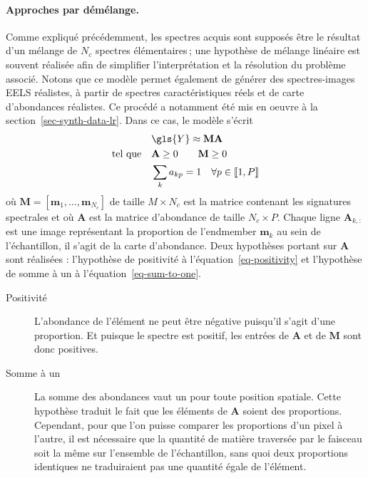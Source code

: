    \paragraph{Approches par démélange.} Comme expliqué précédemment, les spectres acquis sont supposés être le résultat d'un mélange de $N_c$ spectres élémentaires\,; une hypothèse de mélange linéaire est souvent réalisée afin de simplifier l'interprétation et la résolution du problème associé. %
    Notons que ce modèle permet également de générer des spectres-images EELS réalistes, à partir de spectres caractéristiques réels et de carte d'abondances réalistes. Ce procédé a notamment été mis en oeuvre à la section~\ref{sec-synth-data-lr}.
    Dans ce cas, le modèle s'écrit~\cite{dobigeon2016linear}
    \begin{align}
    &\gls{Y} \approx \mathbf{M}\mathbf{A}\\
    \text{tel que}\quad &\mathbf{A} \geq 0\qquad \mathbf{M} \geq 0\label{eq-positivity}\\
    &\sum_k a_{kp} = 1 \quad \forall p\in\llbracket 1 , P \rrbracket \label{eq-sum-to-one}
    \end{align}
    où $\mathbf{M}=[\mathbf{m}_1,\dots,\mathbf{m}_{N_c}]$ de taille $M\times N_c$ est la matrice contenant les signatures spectrales et où $\mathbf{A}$ est la matrice d'abondance de taille $N_c\times P$. Chaque ligne $\mathbf{A}_{k,:}$ est une image représentant la proportion de l'endmember $\mathbf{m}_k$ au sein de l'échantillon, il s'agit de la carte d'abondance. Deux hypothèses portant sur $\mathbf{A}$ sont réalisées : l'hypothèse de positivité à l'équation~\eqref{eq-positivity} et l'hypothèse de somme à un à l'équation~\eqref{eq-sum-to-one}.
    \begin{description}
        \item[Positivité] L'abondance de l'élément ne peut être négative puisqu'il s'agit d'une proportion. Et puisque le spectre est positif, les entrées de $\mathbf{A}$ et de $\mathbf{M}$ sont donc positives.
        \item[Somme à un] La somme des abondances vaut un pour toute position spatiale. Cette hypothèse traduit le fait que les éléments de $\mathbf{A}$ soient des proportions. Cependant, pour que l'on puisse comparer les proportions d'un pixel à l'autre, il est nécessaire que la quantité de matière traversée par le faisceau soit la même sur l'ensemble de l'échantillon, sans quoi deux proportions identiques ne traduiraient pas une quantité égale de l'élément.
    \end{description}
